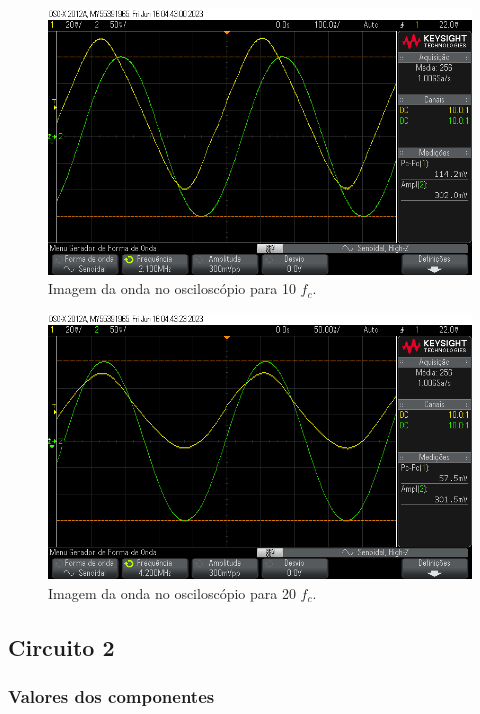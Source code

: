 \begin{figure}[H]
    \centering
    \includegraphics[width=1\columnwidth]{images/exemplo1_10_fc.png}
    \caption{Imagem da onda no osciloscópio para 10 $f_c$.}
\end{figure}


\begin{figure}[H]
    \centering
    \includegraphics[width=1\columnwidth]{images/exemplo1_20_fc.png}
    \caption{Imagem da onda no osciloscópio para 20 $f_c$.}
\end{figure}
\newpage


\subsection{Circuito 2}


\subsubsection{Valores dos componentes}


